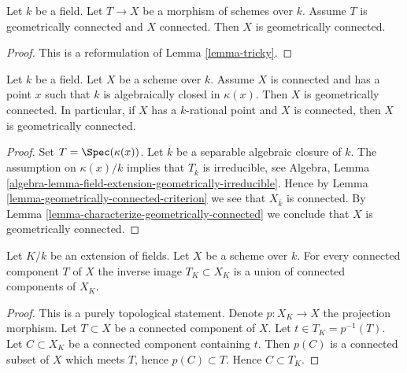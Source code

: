 \begin{lemma}
\label{lemma-geometrically-connected-criterion}
\begin{reference}
\cite[IV Corollary 4.5.13.1(i)]{EGA}
\end{reference}
Let $k$ be a field. Let $T \to X$ be a morphism of schemes over $k$.
Assume $T$ is geometrically connected and $X$ connected.
Then $X$ is geometrically connected.
\end{lemma}

\begin{proof}
This is a reformulation of
Lemma \ref{lemma-tricky}.
\end{proof}

\begin{lemma}
\label{lemma-geometrically-connected-if-connected-and-point}
Let $k$ be a field. Let $X$ be a scheme over $k$.
Assume $X$ is connected and has a point $x$ such that
$k$ is algebraically closed in $\kappa(x)$.
Then $X$ is geometrically connected.
In particular, if $X$ has a $k$-rational point and $X$ is connected,
then $X$ is geometrically connected.
\end{lemma}

\begin{proof}
Set $T = \Spec(\kappa(x))$. Let $\overline{k}$ be a
separable algebraic closure of $k$. The assumption on $\kappa(x)/k$
implies that $T_{\overline{k}}$ is irreducible, see
Algebra, Lemma \ref{algebra-lemma-field-extension-geometrically-irreducible}.
Hence by
Lemma \ref{lemma-geometrically-connected-criterion}
we see that $X_{\overline{k}}$ is connected. By
Lemma \ref{lemma-characterize-geometrically-connected}
we conclude that $X$ is geometrically connected.
\end{proof}

\begin{lemma}
\label{lemma-inverse-image-connected-component}
Let $K/k$ be an extension of fields.
Let $X$ be a scheme over $k$.
For every connected component $T$ of $X$ the inverse image
$T_K \subset X_K$ is a union of connected components of $X_K$.
\end{lemma}

\begin{proof}
This is a purely topological statement.
Denote $p : X_K \to X$ the projection morphism.
Let $T \subset X$ be a connected component of $X$.
Let $t \in T_K = p^{-1}(T)$. Let $C \subset X_K$ be a connected component
containing $t$. Then $p(C)$ is a connected subset of $X$
which meets $T$, hence $p(C) \subset T$. Hence $C \subset T_K$.
\end{proof}

